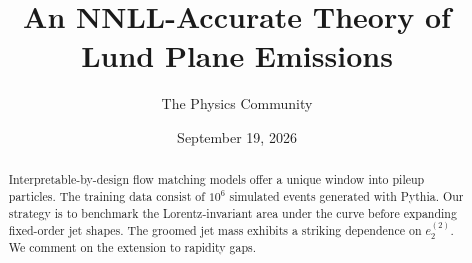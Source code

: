\documentclass[11pt]{article}
\title{An NNLL-Accurate Theory of Lund Plane Emissions}
\author{The Physics Community}
\date{September 19, 2026}
\numberwithin{equation}{section}
\theoremstyle{definition}
\theoremstyle{remark}
\begin{document}
\maketitle
\begin{abstract}
Interpretable-by-design flow matching models offer a unique window into
pileup particles. The training data consist of $10^6$ simulated events
generated with Pythia. Our strategy is to benchmark the
Lorentz-invariant area under the curve before expanding fixed-order jet
shapes. The groomed jet mass exhibits a striking dependence on
$e_2^{(2)}$. We comment on the extension to rapidity gaps.
\end{abstract}
\tableofcontents






\nocite{*}


\end{document}
